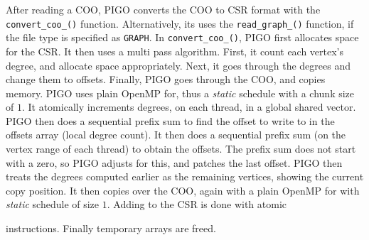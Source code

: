 After reading a COO, PIGO converts the COO to CSR format with the \texttt{convert\_coo\_()} function. Alternatively, its uses the \texttt{read\_graph\_()} function, if the file type is specified as \texttt{GRAPH}. In \texttt{convert\_coo\_()}, PIGO first allocates space for the CSR. It then uses a multi pass algorithm. First, it count each vertex's degree, and allocate space appropriately. Next, it goes through the degrees and change them to offsets. Finally, PIGO goes through the COO, and copies memory. PIGO uses plain OpenMP for, thus a \textit{static} schedule with a chunk size of $1$. It atomically increments degrees, on each thread, in a global shared vector. PIGO then does a sequential prefix sum to find the offset to write to in the offsets array (local degree count). It then does a sequential prefix sum (on the vertex range of each thread) to obtain the offsets. The prefix sum does not start with a zero, so PIGO adjusts for this, and patches the last offset. PIGO then treats the degrees computed earlier as the remaining vertices, showing the current copy position. It then copies over the COO, again with a plain OpenMP for with \textit{static} schedule of size $1$. Adding to the CSR is done with atomic instructions. Finally temporary arrays are freed.


